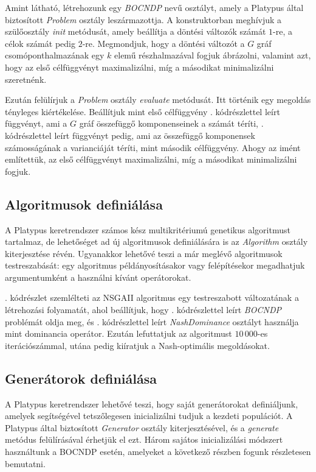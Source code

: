 

Amint látható, létrehozunk egy \emph{BOCNDP} nevű osztályt, amely a Platypus által biztosított \emph{Problem} osztály leszármazottja.
A konstruktorban meghívjuk a szülőosztály \emph{init} metódusát, amely beállítja a döntési változók számát $1$-re, a célok számát pedig $2$-re.
Megmondjuk, hogy a döntési változót a $G$ gráf csomóponthalmazának egy $k$ elemű részhalmazával fogjuk ábrázolni, valamint azt, hogy az első célfüggvényt maximalizálni, míg a másodikat minimalizálni szeretnénk.

Ezután felülírjuk a \emph{Problem} osztály \emph{evaluate} metódusát. Itt történik egy megoldás tényleges kiértékelése.
Beállítjuk mint első célfüggvény . kódrészlettel leírt függvényt, ami a $G$ gráf összefüggő komponenseinek a számát téríti,
. kódrészlettel leírt függvényt pedig, ami az összefüggő komponensek számosságának a varianciáját téríti, mint második célfüggvény.
Ahogy az imént említettük, az első célfüggvényt maximalizálni, míg a másodikat minimalizálni fogjuk.


\subsection{Algoritmusok definiálása}
A Platypus keretrendszer számos kész multikritériumú genetikus algoritmust tartalmaz, de lehetőséget ad új algoritmusok definiálására is az \emph{Algorithm} osztály kiterjesztése révén.
Ugyanakkor lehetővé teszi a már meglévő algoritmusok testreszabását: egy algoritmus példányosításakor vagy felépítésekor megadhatjuk argumentumként a használni kívánt operátorokat.



. kódrészlet szemlélteti az NSGAII algoritmus egy testreszabott változatának a létrehozási folyamatát,
ahol beállítjuk, hogy . kódrészlettel leírt \emph{BOCNDP} problémát oldja meg, és . kódrészlettel leírt \emph{NashDominance} osztályt használja mint dominancia operátor.
Ezután lefuttatjuk az algoritmust $10\,000$-es iterációszámmal, utána pedig kiíratjuk a Nash-optimális megoldásokat.


\subsection{Generátorok definiálása}
A Platypus keretrendszer lehetővé teszi, hogy saját generátorokat definiáljunk, amelyek segítségével tetszőlegesen inicializálni tudjuk a kezdeti populációt.
A Platypus által biztosított \emph{Generator} osztály kiterjesztésével, és a \emph{generate} metódus felülírásával érhetjük el ezt.
Három sajátos inicializálási módszert használtunk a BOCNDP esetén, amelyeket a következő részben fogunk részletesen bemutatni.
